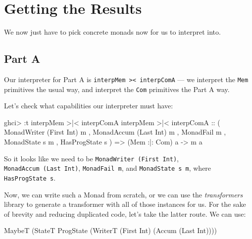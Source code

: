 \documentclass[]{article}
\newenvironment{Shaded}{}{}
\newcommand{\DataTypeTok}[1]{\textcolor[rgb]{0.56,0.13,0.00}{#1}}
\newcommand{\FunctionTok}[1]{\textcolor[rgb]{0.02,0.16,0.49}{#1}}
\newcommand{\NormalTok}[1]{#1}
\newcommand{\OtherTok}[1]{\textcolor[rgb]{0.00,0.44,0.13}{#1}}
\begin{document}
\hypertarget{getting-the-results}{%
\section{Getting the Results}\label{getting-the-results}}

We now just have to pick concrete monads now for us to interpret into.

\hypertarget{part-a}{%
\subsection{Part A}\label{part-a}}

Our interpreter for Part A is
\texttt{interpMem\ \textgreater{}\textbar{}\textless{}\ interpComA} --- we
interpret the \texttt{Mem} primitives the usual way, and interpret the
\texttt{Com} primitives the Part A way.

Let's check what capabilities our interpreter must have:

\begin{Shaded}
\begin{Highlighting}[]
\NormalTok{ghci}\FunctionTok{>} \FunctionTok{:}\NormalTok{t interpMem }\FunctionTok{>|<}\NormalTok{ interpComA}
\NormalTok{interpMem }\FunctionTok{>|<}\NormalTok{ interpComA}
\OtherTok{    ::}\NormalTok{ ( }\DataTypeTok{MonadWriter}\NormalTok{ (}\DataTypeTok{First} \DataTypeTok{Int}\NormalTok{) m}
\NormalTok{       , }\DataTypeTok{MonadAccum}\NormalTok{ (}\DataTypeTok{Last} \DataTypeTok{Int}\NormalTok{) m}
\NormalTok{       , }\DataTypeTok{MonadFail}\NormalTok{ m}
\NormalTok{       , }\DataTypeTok{MonadState}\NormalTok{ s m}
\NormalTok{       , }\DataTypeTok{HasProgState}\NormalTok{ s}
\NormalTok{       )}
    \OtherTok{=>}\NormalTok{ (}\DataTypeTok{Mem} \FunctionTok{:|:} \DataTypeTok{Com}\NormalTok{) a}
    \OtherTok{->}\NormalTok{ m a}
\end{Highlighting}
\end{Shaded}

So it looks like we need to be \texttt{MonadWriter\ (First\ Int)},
\texttt{MonadAccum\ (Last\ Int)}, \texttt{MonadFail\ m}, and
\texttt{MonadState\ s\ m}, where \texttt{HasProgState\ s}.

Now, we can write such a Monad from scratch, or we can use the
\emph{transformers} library to generate a transformer with all of those
instances for us. For the sake of brevity and reducing duplicated code, let's
take the latter route. We can use:

\begin{Shaded}
\begin{Highlighting}[]
\DataTypeTok{MaybeT}\NormalTok{ (}\DataTypeTok{StateT} \DataTypeTok{ProgState}\NormalTok{ (}\DataTypeTok{WriterT}\NormalTok{ (}\DataTypeTok{First} \DataTypeTok{Int}\NormalTok{) (}\DataTypeTok{Accum}\NormalTok{ (}\DataTypeTok{Last} \DataTypeTok{Int}\NormalTok{))))}
\end{Highlighting}
\end{Shaded}
\end{document}

